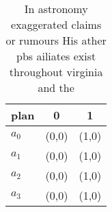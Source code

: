 \documentclass[a4paper]{article}
\begin{document}
\begin{table}
\begin{adjustbox}{width=1\columnwidth}
\begin{tabular}{|l|l|l|}
\hline
\textbf{plan} & \multicolumn{1}{c|}{\textbf{0}} & \multicolumn{1}{c|}{\textbf{1}} \\ \hline
\textbf{$a_0$}  & (0,0) & (1,0) \\ \hline
\textbf{$a_1$}  & (0,0) & (1,0) \\ \hline
\textbf{$a_2$}  & (0,0) & (1,0) \\ \hline
\textbf{$a_3$}  & (0,0) & (1,0) \\ \hline
\end{tabular}
\end{adjustbox}
\caption{In astronomy exaggerated claims or rumours His ather pbs ailiates exist throughout virginia and the
}
\end{table}
\end{document}
